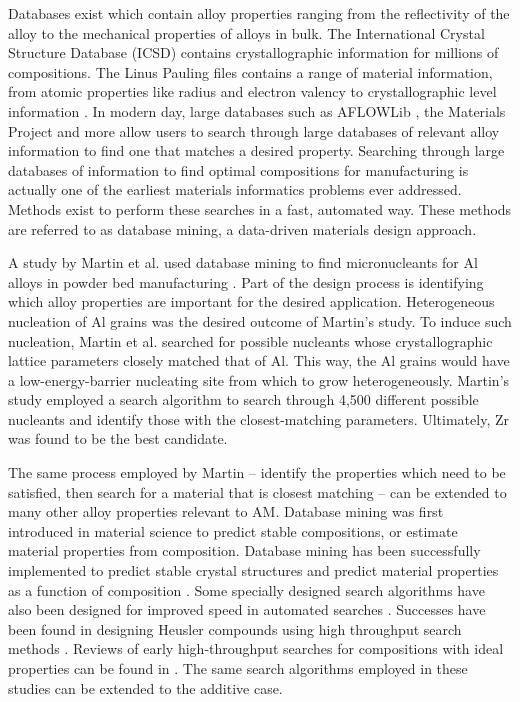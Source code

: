 Databases exist which contain alloy properties ranging from the reflectivity of the alloy to the mechanical properties of alloys in bulk. The International Crystal Structure Database (ICSD) contains crystallographic information for millions of compositions. The Linus Pauling files contains a range of material information, from atomic properties like radius and electron valency to crystallographic level information \cite{Villars1998}. In modern day, large databases such as AFLOWLib \cite{Curtarolo2012a}, the Materials Project \cite{Jain2013} and more allow users to search through large databases of relevant alloy information to find one that matches a desired property. Searching through large databases of information to find optimal compositions for manufacturing is actually one of the earliest materials informatics problems ever addressed. Methods exist to perform these searches in a fast, automated way. These methods are referred to as database mining, a data-driven materials design approach.

A study by Martin et al. used database mining to find micronucleants for Al alloys in powder bed manufacturing \cite{Martin2017}. Part of the design process is identifying which alloy properties are important for the desired application. Heterogeneous nucleation of Al grains was the desired outcome of Martin's study. To induce such nucleation, Martin et al. searched for possible nucleants whose crystallographic lattice parameters closely matched that of Al. This way, the Al grains would have a low-energy-barrier nucleating site from which to grow heterogeneously. Martin's study employed a search algorithm to search through 4,500 different possible nucleants and identify those with the closest-matching parameters. Ultimately, Zr was found to be the best candidate.

The same process employed by Martin -- identify the properties which need to be satisfied, then search for a material that is closest matching -- can be extended to many other alloy properties relevant to AM. Database mining was first introduced in material science to predict stable compositions, or estimate material properties from composition. Database mining has been successfully implemented to predict stable crystal structures \cite{Franceschetti1999, Fischer2006, Oganov2006} and predict material properties as a function of composition \cite{Ikeda1997, Gopakumar2018, Wu2018, Kirklin2013, Setyawan2011}. Some specially designed search algorithms have also been designed for improved speed in automated searches \cite{Wolf2000}. Successes have been found in designing Heusler compounds using high throughput search methods \cite{Roy2012}. Reviews of early high-throughput searches for compositions with ideal properties can be found in \cite{Gilmer1998, Koinuma2004}. The same search algorithms employed in these studies can be extended to the additive case.


